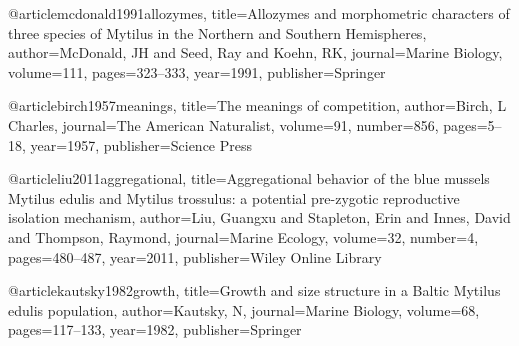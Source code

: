 @article{mcdonald1991allozymes,
  title={Allozymes and morphometric characters of three species of Mytilus in the Northern and Southern Hemispheres},
  author={McDonald, JH and Seed, Ray and Koehn, RK},
  journal={Marine Biology},
  volume={111},
  pages={323--333},
  year={1991},
  publisher={Springer}
}

@article{birch1957meanings,
  title={The meanings of competition},
  author={Birch, L Charles},
  journal={The American Naturalist},
  volume={91},
  number={856},
  pages={5--18},
  year={1957},
  publisher={Science Press}
}

@article{liu2011aggregational,
  title={Aggregational behavior of the blue mussels Mytilus edulis and Mytilus trossulus: a potential pre-zygotic reproductive isolation mechanism},
  author={Liu, Guangxu and Stapleton, Erin and Innes, David and Thompson, Raymond},
  journal={Marine Ecology},
  volume={32},
  number={4},
  pages={480--487},
  year={2011},
  publisher={Wiley Online Library}
}

@article{kautsky1982growth,
  title={Growth and size structure in a Baltic Mytilus edulis population},
  author={Kautsky, N},
  journal={Marine Biology},
  volume={68},
  pages={117--133},
  year={1982},
  publisher={Springer}
}